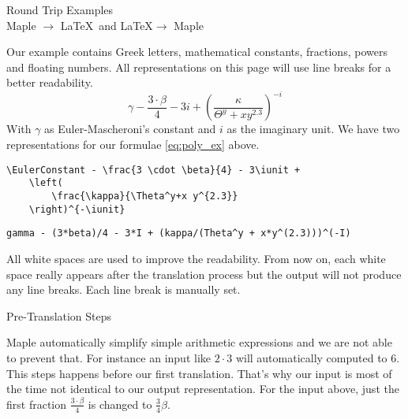 \documentclass{article}
\newcommand{\iunit}{i}
\newcommand{\EulerConstant}{\gamma}
\begin{document}
\begin{center}
    \Large Round Trip Examples\\[12pt]
    \large Maple $\rightarrow$ \LaTeX\ and \LaTeX $\rightarrow$ Maple
\end{center}

\noindent Our example contains Greek letters, mathematical constants, fractions, powers and floating numbers. All representations on this page will use line breaks for a better readability.
\begin{equation}\label{eq:poly_ex}
    \EulerConstant - \frac{3 \cdot \beta}{4} - 3\iunit + 
        \left( 
            \frac{\kappa}{\Theta^y+x y^{2.3}} 
        \right)^{-\iunit} 
\end{equation}
\noindent With $\EulerConstant$ as Euler-Mascheroni's constant and $\iunit$ as the imaginary unit. We have two representations for our formulae \ref{eq:poly_ex} above.
\begin{lstlisting}[mathescape,caption={Semantic \LaTeX\ representation of \ref{eq:poly_ex}}]
\EulerConstant - \frac{3 \cdot \beta}{4} - 3\iunit + 
    \left( 
        \frac{\kappa}{\Theta^y+x y^{2.3}} 
    \right)^{-\iunit} 
\end{lstlisting}
\begin{lstlisting}[mathescape,caption={Maple's representation of \ref{eq:poly_ex}}]
gamma - (3*beta)/4 - 3*I + (kappa/(Theta^y + x*y^(2.3)))^(-I)
\end{lstlisting}
\noindent All white spaces are used to improve the readability. From now on, each white space really appears after the translation process but the output will not produce any line breaks. Each line break is manually set.

\vspace{12pt}
\begin{center}
    \large Pre-Translation Steps\\
\end{center}
Maple automatically simplify simple arithmetic expressions and we are not able to prevent that. For instance an input like $2 \cdot 3$ will automatically computed to $6$. This steps happens before our first translation. That's why our input is most of the time not identical to our output representation. For the input above, just the first fraction $\frac{3 \cdot \beta}{4}$ is changed to $\frac{3}{4}\beta$.
\end{document}
